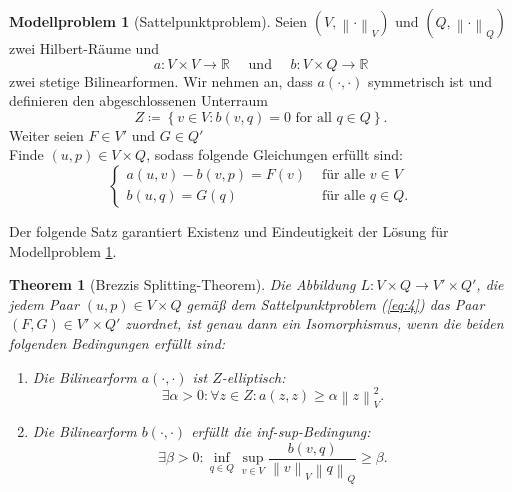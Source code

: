 \documentclass[a4paper]{scrartcl}
\newcommand{\real}{\mathbb{R}}
\newcommand{\vnorm}[1]{\left\lVert#1\right\rVert_V}
\newcommand{\norm}[1]{\left\lVert#1\right\rVert}
\theoremstyle{plain}
\newtheorem{theorem}{Theorem}
\theoremstyle{definition}
\newtheorem{modellproblem}{Modellproblem}
\theoremstyle{remark}
\begin{document}
\begin{modellproblem}[Sattelpunktproblem] \label{problem:2}
  Seien \((V,\vnorm{\cdot})\)  und \((Q,\norm{\cdot}_Q)\) zwei
  Hilbert-Räume und 
  \[a\colon V\times V \rightarrow \real 
  \quad \text{ und } \quad
  b\colon V\times Q \rightarrow \real\]
  zwei stetige Bilinearformen. Wir nehmen an, dass \(a(\cdot, \cdot)\) symmetrisch
  ist und definieren den abgeschlossenen Unterraum 
  \begin{equation}
    \label{eq:7}
    Z \coloneqq \left\{v \in V: b(v,q) = 0 \text{ for all } q\in Q\right\}.
  \end{equation}
  Weiter seien \(F \in V'\) und \(G \in Q'\)\\
  Finde \((u,p) \in V\times Q\), sodass folgende Gleichungen erfüllt
  sind: 
  \begin{equation}
    \label{eq:4}
    \begin{cases}
      a(u,v) - b(v,p) = F(v) & \text{ für alle } v \in V \\
      b(u,q) = G(q) & \text{ für alle } q \in Q.
    \end{cases}
  \end{equation}
\end{modellproblem}

\noindent Der folgende Satz garantiert Existenz und Eindeutigkeit der Lösung für
Modellproblem \ref{problem:2}. 

\begin{theorem}[Brezzis Splitting-Theorem] \label{thm:1}
  Die Abbildung \(L\colon V\times Q \rightarrow V' \times Q'\), die
  jedem Paar \((u,p) \in V\times Q\) gemäß dem Sattelpunktproblem
  (\ref{eq:4}) das Paar \((F,G) \in V'\times Q'\) zuordnet, ist genau
  dann ein Isomorphismus, wenn die beiden folgenden Bedingungen erfüllt
  sind: 
  \begin{enumerate}[label=(\roman*)]
  \item Die Bilinearform \(a(\cdot, \cdot)\) ist \(Z\)-elliptisch:
    \begin{equation}\label{eq:5}
      \exists \alpha > 0: \forall z \in Z: a(z,z) \geq \alpha \vnorm{z}^2.
    \end{equation}

  \item Die Bilinearform \(b(\cdot, \cdot)\) erfüllt die
    inf-sup-Bedingung: 
    \begin{equation}
      \label{eq:6}
      \exists \beta > 0: \inf_{q\in Q} \sup_{v\in V} \frac{b(v,q)}{\vnorm{v}\norm{q}_Q} \geq \beta.
    \end{equation}
  \end{enumerate}
\end{theorem}
\end{document}
